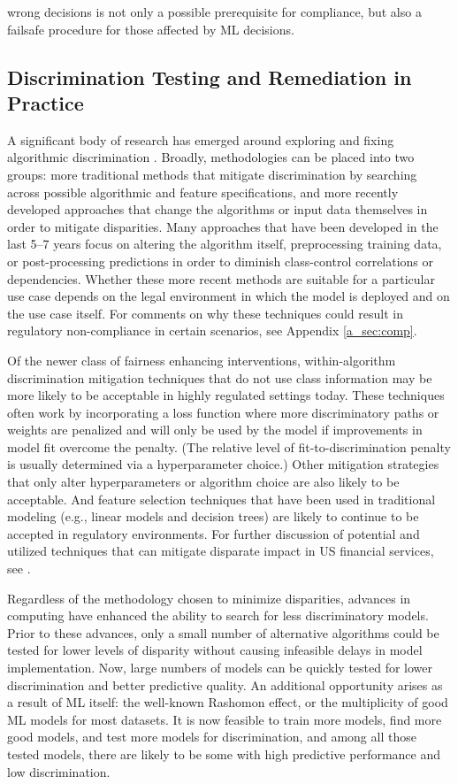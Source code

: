 \documentclass[information,article,submit,moreauthors,pdftex]{definitions/mdpi}
\begin{document}
wrong decisions is not only a possible prerequisite for compliance, but also a failsafe procedure for those affected by ML decisions.  

\subsection{Discrimination Testing and Remediation in Practice}\label{ssec:disc_rem}

A significant body of research has emerged around exploring and fixing algorithmic discrimination \cite{friedler2019comparative}. Broadly, methodologies can be placed into two groups: more traditional methods that mitigate discrimination by searching across possible algorithmic and feature specifications, and more recently developed approaches that change the algorithms or input data themselves in order to mitigate disparities. Many approaches that have been developed in the last 5--7 years focus on altering the algorithm itself, preprocessing training data, or post-processing predictions in order to diminish class-control correlations or dependencies. Whether these more recent methods are suitable for a particular use case depends on the legal environment in which the model is deployed and on the use case itself. For comments on why these techniques could result in regulatory non-compliance in certain scenarios, see Appendix \ref{a_sec:comp}.

Of the newer class of fairness enhancing interventions, within-algorithm discrimination mitigation techniques that do not use class information may be more likely to be acceptable in highly regulated settings today. These techniques often work by incorporating a loss function where more discriminatory paths or weights are penalized and will only be used by the model if improvements in model fit overcome the penalty. (The relative level of fit-to-discrimination penalty is usually determined via a hyperparameter choice.) Other mitigation strategies that only alter hyperparameters or algorithm choice are also likely to be acceptable. And feature selection techniques that have been used in traditional modeling (e.g., linear models and decision trees) are likely to continue to be accepted in regulatory environments.  For further discussion of potential and utilized techniques that can mitigate disparate impact in US financial services, see \citet{schmidt2019introduction}. 

Regardless of the methodology chosen to minimize disparities, advances in computing have enhanced the ability to search for less discriminatory models.  Prior to these advances, only a small number of alternative algorithms could be tested for lower levels of disparity without causing infeasible delays in model implementation.  Now, large numbers of models can be quickly tested for lower discrimination and better predictive quality.  An additional opportunity arises as a result of ML itself: the well-known Rashomon effect, or the multiplicity of good ML models for most datasets. It is now feasible to train more models, find more good models, and test more models for discrimination, and among all those tested models, there are likely to be some with high predictive performance and low discrimination.
\end{document}

